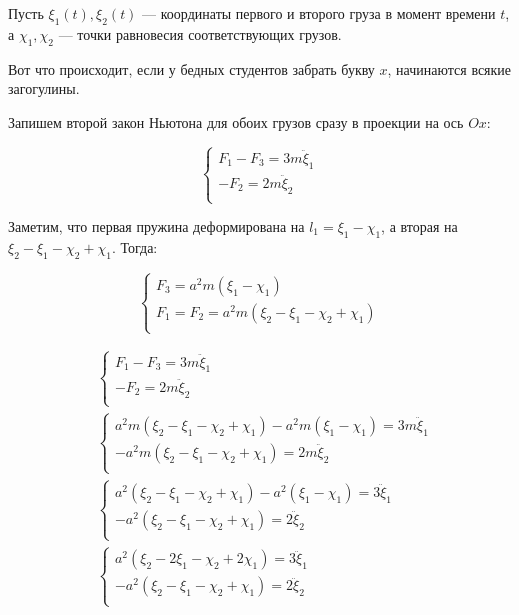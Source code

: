 \begin{center}
    
\end{center}

Пусть \(\xi_1(t), \xi_2(t)\) --- координаты первого и второго груза в момент времени \(t\), а \(\chi_1, \chi_2\) --- точки равновесия соответствующих грузов.

Вот что происходит, если у бедных студентов забрать букву \(x\), начинаются всякие загогулины.

Запишем второй закон Ньютона для обоих грузов сразу в проекции на ось \(Ox\):

\[\begin{cases}
        F_1 - F_3 = 3m\ddot \xi_1 \\
        -F_2 = 2m\ddot \xi_2      \\
    \end{cases}\]

Заметим, что первая пружина деформирована на \(l_1 = \xi_1 - \chi_1\), а вторая на \(\xi_2 - \xi_1 - \chi_2 + \chi_1\). Тогда:

\[\begin{cases}
        F_3 = a^2m(\xi_1 - \chi_1)                        \\
        F_1 = F_2 = a^2m(\xi_2 - \xi_1 - \chi_2 + \chi_1) \\
    \end{cases}\]

\begin{align*}
     & \begin{cases}
        F_1 - F_3 = 3m\ddot \xi_1 \\
        - F_2 = 2m\ddot \xi_2     \\
    \end{cases} \\
     & \begin{cases}
        a^2m(\xi_2 - \xi_1 - \chi_2 + \chi_1) - a^2m(\xi_1 - \chi_1) = 3m\ddot \xi_1 \\
        - a^2m(\xi_2 - \xi_1 - \chi_2 + \chi_1) = 2m\ddot \xi_2                      \\
    \end{cases} \\
     & \begin{cases}
        a^2(\xi_2 - \xi_1 - \chi_2 + \chi_1) - a^2(\xi_1 - \chi_1) = 3\ddot \xi_1 \\
        - a^2(\xi_2 - \xi_1 - \chi_2 + \chi_1) = 2\ddot \xi_2                     \\
    \end{cases} \\
     & \begin{cases}
        a^2(\xi_2 - 2\xi_1 - \chi_2 + 2\chi_1) = 3\ddot \xi_1 \\
        - a^2(\xi_2 - \xi_1 - \chi_2 + \chi_1) = 2\ddot \xi_2 \\
    \end{cases} \\
\end{align*}

